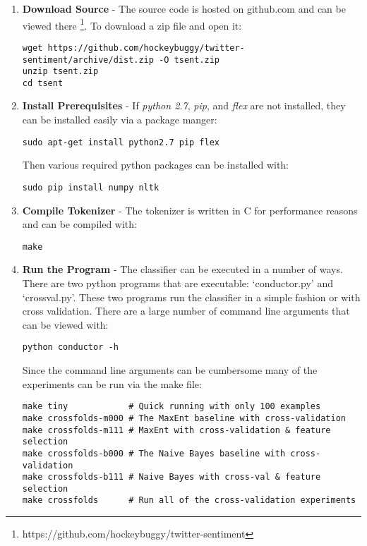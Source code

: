 \documentclass[final,3p,12pt]{elsarticle}
\begin{document}
\begin{enumerate}

    \item \textbf{Download Source} - The source code is hosted on github.com
        and can be viewed there
        \footnote{https://github.com/hockeybuggy/twitter-sentiment}. To download a
        zip file and open it:

\begin{Verbatim}[fontsize=\footnotesize]
wget https://github.com/hockeybuggy/twitter-sentiment/archive/dist.zip -O tsent.zip
unzip tsent.zip
cd tsent
\end{Verbatim}


    \item \textbf{Install Prerequisites} - If \textit{python 2.7},
        \textit{pip}, and \textit{flex} are not installed, they can be
        installed easily via a package manger:

\begin{Verbatim}[fontsize=\footnotesize]
sudo apt-get install python2.7 pip flex
\end{Verbatim}

Then various required python packages can be installed with:

\begin{Verbatim}[fontsize=\footnotesize]
sudo pip install numpy nltk
\end{Verbatim}

    \item \textbf{Compile Tokenizer} - The tokenizer is written in C for
        performance reasons and can be compiled with:
\begin{Verbatim}[fontsize=\footnotesize]
make
\end{Verbatim}

    \item \textbf{Run the Program} - The classifier can be executed in a number
        of ways. There are two python programs that are executable:
        `conductor.py' and `crossval.py'. These two programs run the classifier
        in a simple fashion or with cross validation. There are a large number
        of command line arguments that can be viewed with:

\begin{Verbatim}[fontsize=\footnotesize]
python conductor -h
\end{Verbatim}

Since the command line arguments can be cumbersome many of the experiments can
be run via the make file:

\begin{Verbatim}[fontsize=\footnotesize]
make tiny            # Quick running with only 100 examples
make crossfolds-m000 # The MaxEnt baseline with cross-validation
make crossfolds-m111 # MaxEnt with cross-validation & feature selection
make crossfolds-b000 # The Naive Bayes baseline with cross-validation
make crossfolds-b111 # Naive Bayes with cross-val & feature selection
make crossfolds      # Run all of the cross-validation experiments
\end{Verbatim}

\end{enumerate}
\end{document}
